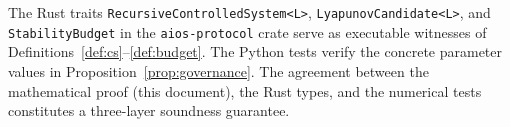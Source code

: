 \documentclass[11pt,a4paper]{article}
\begin{document}
\begin{remark}
\label{rem:witnesses}
The Rust traits \texttt{RecursiveControlledSystem\textless L\textgreater},
\texttt{LyapunovCandidate\textless L\textgreater}, and
\texttt{StabilityBudget} in the \texttt{aios-protocol} crate serve as
executable witnesses of Definitions~\ref{def:cs}--\ref{def:budget}.  The
Python tests verify the concrete parameter values in
Proposition~\ref{prop:governance}.  The agreement between the mathematical
proof (this document), the Rust types, and the numerical tests constitutes
a three-layer soundness guarantee.
\end{remark}




\end{document}
